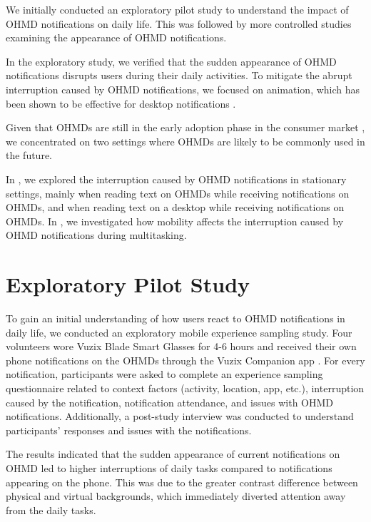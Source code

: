 We initially conducted an exploratory pilot study to understand the impact of OHMD notifications on daily life. This was followed by more controlled studies examining the appearance of OHMD notifications.

In the exploratory study, we verified that the sudden appearance of OHMD notifications disrupts users during their daily activities. To mitigate the abrupt interruption caused by OHMD notifications, we focused on \fading{} animation, which has been shown to be effective for desktop notifications \cite{mccrickard_establishing_2003, mccrickard_evaluating_2001, maglio_tradeoffs_2000}.

Given that OHMDs are still in the early adoption phase in the consumer market \cite{alsop_ar_2022}, we concentrated on two settings where OHMDs are likely to be commonly used in the future.

In \studyone{}, we explored the interruption caused by OHMD notifications in stationary settings, mainly when reading text on OHMDs while receiving notifications on OHMDs, and when reading text on a desktop while receiving notifications on OHMDs.
In \studytwo{}, we investigated how mobility affects the interruption caused by OHMD notifications during multitasking.






\section{Exploratory Pilot Study}
  
To gain an initial understanding of how users react to OHMD notifications in daily life, we conducted an exploratory mobile experience sampling study. Four volunteers wore Vuzix Blade Smart Glasses \cite{vuzix_vuzix_2021} for 4-6 hours and received their own phone notifications on the OHMDs through the Vuzix Companion app \cite{vuzix_companion_2021}. For every notification, participants were asked to complete an experience sampling questionnaire related to context factors (activity, location, app, etc.), interruption caused by the notification, notification attendance, and issues with OHMD notifications. Additionally, a post-study interview was conducted to understand participants' responses and issues with the notifications.

The results indicated that the sudden appearance of current notifications on OHMD led to higher interruptions of daily tasks compared to notifications appearing on the phone. This was due to the greater contrast difference between physical and virtual backgrounds, which immediately diverted attention away from the daily tasks.






